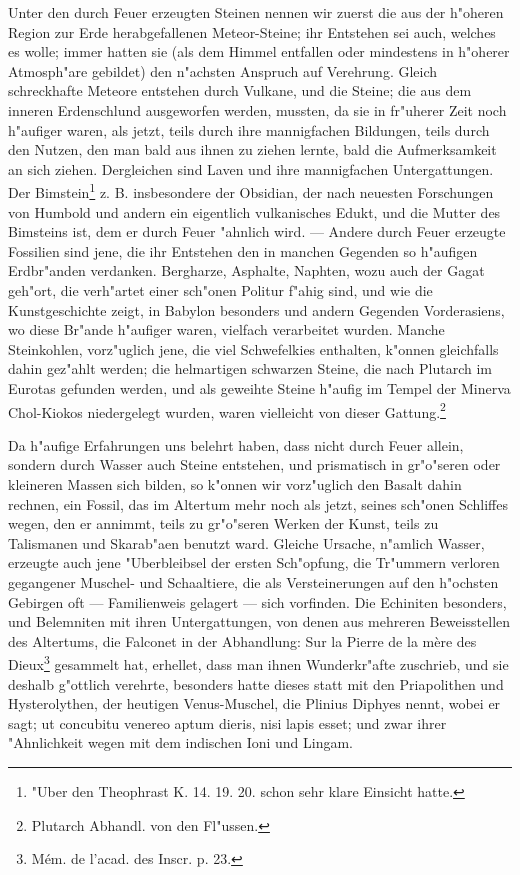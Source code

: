 \documentclass[a4paper, 11pt, oneside, polutonikogreek, german]{article}
\begin{document}
Unter den durch Feuer erzeugten Steinen nennen wir zuerst die aus der h"oheren Region zur Erde herabgefallenen Meteor-Steine; ihr Entstehen sei auch, welches es wolle; immer hatten sie (als dem Himmel entfallen oder mindestens in h"oherer Atmosph"are gebildet) den n"achsten Anspruch auf Verehrung. Gleich schreckhafte Meteore entstehen durch Vulkane, und die Steine; die aus dem inneren Erdenschlund ausgeworfen werden, mussten, da sie in fr"uherer Zeit noch h"aufiger waren, als jetzt, teils durch ihre mannigfachen Bildungen, teils durch den Nutzen, den man bald aus ihnen zu ziehen lernte, bald die Aufmerksamkeit an sich ziehen. Dergleichen sind Laven und ihre mannigfachen Untergattungen. Der Bimstein\footnote{"Uber den Theophrast K. 14. 19. 20. schon sehr klare Einsicht hatte.} z. B. insbesondere der Obsidian, der nach neuesten Forschungen von Humbold und andern ein eigentlich vulkanisches Edukt, und die Mutter des Bimsteins ist, dem er durch Feuer "ahnlich wird. --- Andere durch Feuer erzeugte Fossilien sind jene, die ihr Entstehen den in manchen Gegenden so h"aufigen Erdbr"anden verdanken. Bergharze, Asphalte, Naphten, wozu auch der Gagat geh"ort, die verh"artet einer sch"onen Politur f"ahig sind, und wie die Kunstgeschichte zeigt, in Babylon besonders und andern Gegenden Vorderasiens, wo diese Br"ande h"aufiger waren, vielfach verarbeitet wurden. Manche Steinkohlen, vorz"uglich jene, die viel Schwefelkies enthalten, k"onnen gleichfalls dahin gez"ahlt werden; die helmartigen schwarzen Steine, die nach Plutarch im Eurotas gefunden werden, und als geweihte Steine h"aufig im Tempel der Minerva Chol-Kiokos niedergelegt wurden, waren vielleicht von dieser Gattung.\footnote{Plutarch Abhandl. von den Fl"ussen.}

Da h"aufige Erfahrungen uns belehrt haben, dass nicht durch Feuer allein, sondern durch Wasser auch Steine entstehen, und prismatisch in gr"o"seren oder kleineren Massen sich bilden, so k"onnen wir vorz"uglich den Basalt dahin rechnen, ein Fossil, das im Altertum mehr noch als jetzt, seines sch"onen Schliffes wegen, den er annimmt, teils zu gr"o"seren Werken der Kunst, teils zu Talismanen und Skarab"aen benutzt ward. Gleiche Ursache, n"amlich Wasser, erzeugte auch jene "Uberbleibsel der ersten Sch"opfung, die Tr"ummern verloren gegangener Muschel- und Schaaltiere, die als Versteinerungen auf den h"ochsten Gebirgen oft --- Familienweis gelagert --- sich vorfinden. Die Echiniten besonders, und Belemniten mit ihren Untergattungen, von denen aus mehreren Beweisstellen des Altertums, die Falconet in der Abhandlung: Sur la Pierre de la mère des Dieux\footnote{Mém. de l'acad. des Inscr. p. 23.} gesammelt hat, erhellet, dass man ihnen Wunderkr"afte zuschrieb, und sie deshalb g"ottlich verehrte, besonders hatte dieses statt mit den Priapolithen und Hysterolythen, der heutigen Venus-Muschel, die Plinius Diphyes nennt, wobei er sagt; ut concubitu venereo aptum dieris, nisi lapis esset; und zwar ihrer "Ahnlichkeit wegen mit dem indischen Ioni und Lingam.
\end{document}
